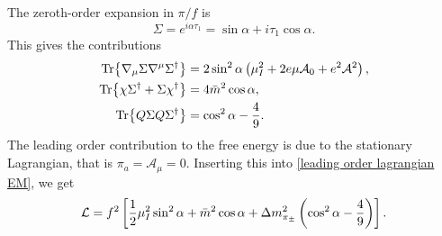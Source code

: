 The zeroth-order expansion in $\pi/f$ is
%
\begin{equation}
    \Sigma = e^{i \alpha \tau_1} = \sin \alpha + i \tau_1 \cos \alpha.
\end{equation}
%
This gives the contributions
%
\begin{align}
    \Tr{\nabla_\mu \Sigma \nabla^\mu \Sigma^\dagger}
    & = 2 \sin^2\alpha\left(\mu_I^2 + 2 e \mu \mathcal A_0 + e^2\mathcal A^2 \right), \\
    \Tr{\chi \Sigma^\dagger + \Sigma \chi^\dagger}
    & =4 \bar m^2 \cos \alpha,\\
    \Tr{Q \Sigma Q \Sigma^\dagger}
    & =  \cos^2 \alpha - \frac{4}{9}.
\end{align}
%
The leading order contribution to the free energy is due to the stationary Lagrangian, that is $\pi_a = \mathcal A_\mu = 0$.
Inserting this into \autoref{leading order lagrangian EM}, we get 
%
\begin{equation}
    \label{static lagrangian with EM}
    \mathcal{L} 
    = f^2 \left[
        \frac{1}{2}\mu_I^2 \sin^2 \alpha + \bar m^2 \cos \alpha 
        + \Delta m^2_{\pi_\pm} \left(\cos^2 \alpha - \frac{4}{9}\right)
    \right].
\end{equation}
%

